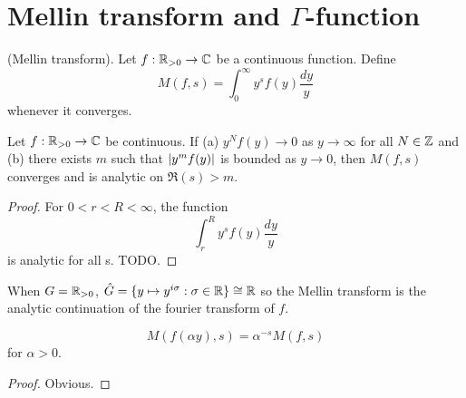 \documentclass{memoir}
\begin{document}
\section{Mellin transform and $\Gamma$-function}
\begin{definition}
    (Mellin transform).
    Let $f:\mathbb{R}_{>0}\to \mathbb{C}$ be a continuous function. Define
    \begin{equation}
        M(f,s) = \int_0^\infty y^s f(y) \frac{dy}y
    \end{equation}
    whenever it converges.
\end{definition}
\begin{lemma}
    Let $f:\mathbb{R}_{>0}\to \mathbb{C}$ be continuous. If (a) $y^Nf(y)\to0$ as $y\to\infty$ for all $N\in\mathbb{Z}$ and (b) there exists $m$ such that $\lvert y^m f(y)\rvert$ is bounded as $y\to0$, then $M(f,s)$ converges and is analytic on $\Re(s)>m$.
\end{lemma}
\begin{proof}
    For $0<r<R<\infty$, the function 
    \begin{equation}
        \int_r^Ry^sf(y)\frac{dy}{y}
    \end{equation}
    is analytic for all s.
    TODO.
\end{proof}
\begin{remark}
    When $G = \mathbb{R}_{>0}$, $\hat G = \{y\mapsto y^{i\sigma}:\sigma\in\mathbb{R}\}\cong \mathbb{R}$ so the Mellin transform is the analytic continuation of the fourier transform of $f$.
\end{remark}
\begin{proposition}
    \begin{equation}
        M(f(\alpha y),s) = \alpha^{-s}M(f,s)
    \end{equation}
    for $\alpha>0$.
\end{proposition}
\begin{proof}
    Obvious.
\end{proof}
\end{document}
